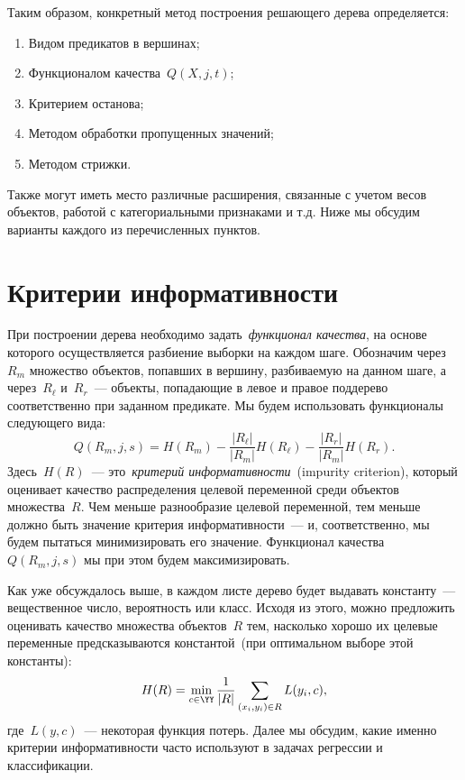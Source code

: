 \documentclass[12pt,fleqn]{article}
\begin{document}
Таким образом, конкретный метод построения решающего дерева определяется:
\begin{enumerate}
    \item Видом предикатов в вершинах;
    \item Функционалом качества~$Q(X, j, t)$;
    \item Критерием останова;
    \item Методом обработки пропущенных значений;
    \item Методом стрижки.
\end{enumerate}
Также могут иметь место различные расширения, связанные с учетом весов объектов,
работой с категориальными признаками и т.д.
Ниже мы обсудим варианты каждого из перечисленных пунктов.

\section{Критерии информативности}
При построении дерева необходимо задать~\emph{функционал качества},
на основе которого осуществляется разбиение выборки на каждом шаге.
Обозначим через~$R_m$ множество объектов, попавших в вершину, разбиваемую на данном шаге,
а через~$R_\ell$ и~$R_r$~--- объекты, попадающие в левое и правое поддерево соответственно
при заданном предикате.
Мы будем использовать функционалы следующего вида:
\[
    Q(R_m, j, s)
    =
    H(R_m)
    -
    \frac{|R_\ell|}{|R_m|}
    H(R_\ell)
    -
    \frac{|R_r|}{|R_m|}
    H(R_r).
\]
Здесь~$H(R)$~--- это~\emph{критерий информативности}~(impurity criterion),
который оценивает качество распределения целевой переменной среди объектов множества~$R$.
Чем меньше разнообразие целевой переменной, тем меньше должно быть значение критерия информативности~---
и, соответственно, мы будем пытаться минимизировать его значение.
Функционал качества~$Q(R_m, j, s)$ мы при этом будем максимизировать.

Как уже обсуждалось выше, в каждом листе дерево будет выдавать константу~--- вещественное число, вероятность
или класс.
Исходя из этого, можно предложить оценивать качество множества объектов~$R$ тем,
насколько хорошо их целевые переменные предсказываются константой~(при оптимальном выборе этой константы):
\[
    H(R)
    =
    \min_{c \in \YY}
    \frac{1}{|R|}
    \sum_{(x_i, y_i) \in R}
        L(y_i, c),
\]
где~$L(y, c)$~--- некоторая функция потерь.
Далее мы обсудим, какие именно критерии информативности часто используют в задачах регрессии и классификации.
\end{document}

